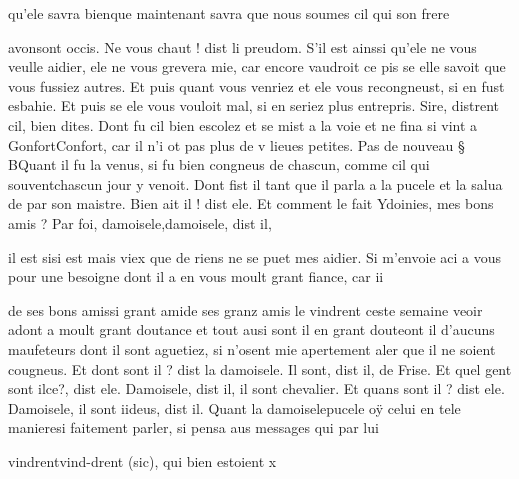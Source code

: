 \documentclass{article}
\begin{document}
\begin{pages}
                     qu’ele savra bienque maintenant savra que nous soumes cil qui son frere
                  
                     avonsont occis.
               Ne vous chaut ! dist li preudom. S’il est ainssi qu’ele ne vous veulle aidier, ele ne vous
                  grevera mie, car encore vaudroit ce pis se elle savoit que vous fussiez autres. Et
                  puis quant vous venriez et ele vous recongneust, si en fust esbahie. Et puis se
                  ele vous vouloit mal, si 
                     en seriez plus entrepris.
               Sire, distrent cil, bien dites. Dont fu cil
               bien escolez et se mist a la voie et ne fina si vint a 
                  GonfortConfort, car il n’i ot pas plus de v lieues 
                  petites. \pend
            \pstart Pas de nouveau § BQuant
               il fu la venus, 
                  si fu bien congneus de chascun, comme cil qui 
                  souventchascun jour y venoit. Dont fist il tant que il parla a la
                  pucele et la salua de par son maistre.
                  Bien ait il ! dist ele. Et comment le fait
                     Ydoinies, mes bons amis ?
               Par foi, 
                     damoisele,damoisele, dist il,
                  
                     il est sisi est mais viex que de riens ne se puet mes aidier. Si m’envoie 
                     aci a vous pour une besoigne dont il a en vous moult grant fiance, car
                     ii
                  
                     de ses bons amissi grant amide ses granz amis le vindrent ceste semaine veoir 
                     adont a moult grant doutance 
                     et tout ausi 
                           sont il en grant douteont il d’aucuns maufeteurs dont il sont aguetiez, si n’osent mie apertement aler
                  que il ne soient cougneus.
               Et dont sont il ? dist la damoisele.
               Il sont, dist il, de Frise.
               Et quel gent sont 
                     ilce?, dist ele. 
                     Damoisele, 
                           dist il, il sont chevalier. Et quans sont il ? dist
               ele. Damoisele, 
                     il sont iideus, 
                  dist il. \pend
            \pstart Quant la 
                     damoiselepucele oÿ celui 
                  en tele manieresi faitement parler, si pensa aus messages 
                  qui par lui 

                        vindrentvind-drent (sic), qui bien estoient x
                     

\end{pages}
\end{document}
